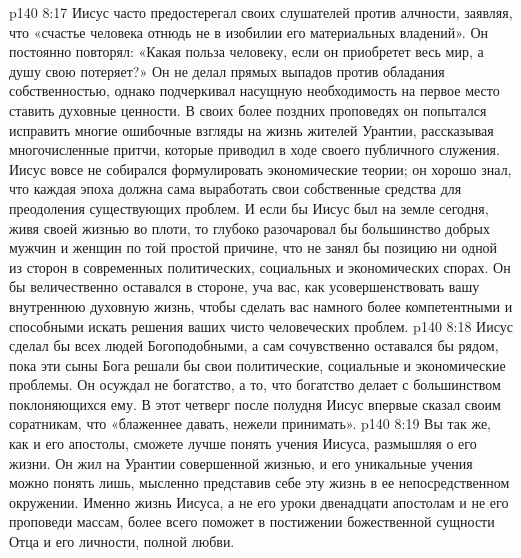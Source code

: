 \vs p140 8:17 Иисус часто предостерегал своих слушателей против алчности, заявляя, что «счастье человека отнюдь не в изобилии его материальных владений». Он постоянно повторял: «Какая польза человеку, если он приобретет весь мир, а душу свою потеряет?» Он не делал прямых выпадов против обладания собственностью, однако подчеркивал насущную необходимость на первое место ставить духовные ценности. В своих более поздних проповедях он попытался исправить многие ошибочные взгляды на жизнь жителей Урантии, рассказывая многочисленные притчи, которые приводил в ходе своего публичного служения. Иисус вовсе не собирался формулировать экономические теории; он хорошо знал, что каждая эпоха должна сама выработать свои собственные средства для преодоления существующих проблем. И если бы Иисус был на земле сегодня, живя своей жизнью во плоти, то глубоко разочаровал бы большинство добрых мужчин и женщин по той простой причине, что не занял бы позицию ни одной из сторон в современных политических, социальных и экономических спорах. Он бы величественно оставался в стороне, уча вас, как усовершенствовать вашу внутреннюю духовную жизнь, чтобы сделать вас намного более компетентными и способными искать решения ваших чисто человеческих проблем.
\vs p140 8:18 \pc Иисус сделал бы всех людей Богоподобными, а сам сочувственно оставался бы рядом, пока эти сыны Бога решали бы свои политические, социальные и экономические проблемы. Он осуждал не богатство, а то, что богатство делает с большинством поклоняющихся ему. В этот четверг после полудня Иисус впервые сказал своим соратникам, что «блаженнее давать, нежели принимать».
\vs p140 8:19 \pc {}\bibnobreakspace {} Вы так же, как и его апостолы, сможете лучше понять учения Иисуса, размышляя о его жизни. Он жил на Урантии совершенной жизнью, и его уникальные учения можно понять лишь, мысленно представив себе эту жизнь в ее непосредственном окружении. Именно жизнь Иисуса, а не его уроки двенадцати апостолам и не его проповеди массам, более всего поможет в постижении божественной сущности Отца и его личности, полной любви.
